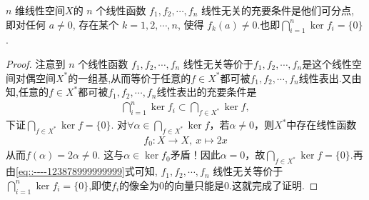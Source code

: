 \documentclass[../../main.tex]{subfiles}
\begin{document}
\begin{corollary}\label{corollary:对偶空间的基的充要条件}
\( n \) 维线性空间$X$的 \( n \) 个线性函数 \( f_1, f_2, \cdots, f_n \) 线性无关的充要条件是他们可分点, 即对任何 \( a \neq 0 \), 存在某个 \( k = 1, 2, \cdots, n \), 使得 \( f_k(a) \neq 0 \).也即\( \bigcap_{i=1}^n \ker f_i = \{0\} \).
\end{corollary}
\begin{proof}
注意到 \( n \) 个线性函数 \( f_1, f_2, \cdots, f_n \) 线性无关等价于\( f_1, f_2, \cdots, f_n \)是这个线性空间对偶空间$X^*$的一组基,从而等价于任意的$f\in X^*$都可被\( f_1, f_2, \cdots, f_n \)线性表出.又由知,任意的$f\in X^*$都可被\( f_1, f_2, \cdots, f_n \)线性表出的充要条件是
\begin{align}
\bigcap_{i=1}^n \ker f_i \subset \bigcap_{f \in X^*} \ker f,\label{eq::----123878999999999}
\end{align}
下证$\bigcap_{f \in X^*} \ker f = \{0\}$. 对$\forall \alpha \in \bigcap_{f \in X^*} \ker f$，若$\alpha \neq 0$，则$X^*$中存在线性函数
\begin{align*}
f_0: X \longrightarrow X,\ x \longmapsto 2x
\end{align*}
从而$f(\alpha) = 2\alpha \neq 0$. 这与$\alpha \in \ker f_0$矛盾！因此$\alpha = 0$，故$\bigcap_{f \in X^*} \ker f = \{0\}$.再由\eqref{eq::----123878999999999}式可知, \( f_1, f_2, \cdots, f_n \) 线性无关等价于 \( \bigcap_{i=1}^n \ker f_i = \{0\} \),即使$f_i$的像全为0的向量只能是0.这就完成了证明.
\end{proof}
\end{document}
